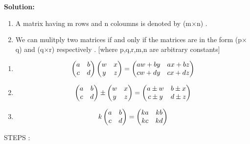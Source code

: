 \documentclass[journal,12pt,twocolumn]{IEEEtran}
\begin{document}
\textbf{Solution:}
       \begin{enumerate}
 \item A matrix having m rows and n coloumns is denoted by
               (m$\times$n) .
  
 \item We can mulitply two matrices if and only if the matrices are 
       in the form (p$\times$q) and (q$\times$r) respectively .
       [where p,q,r,m,n are arbitrary constants]
       \end{enumerate}
       \begin{enumerate}[label=(\roman*)]
 \item \begin{equation}
       \label{eq:2} 
       \begin{pmatrix}a & b \\c & d \end{pmatrix} \begin{pmatrix}w & x \\y & z \end{pmatrix} = 
       \begin{pmatrix}aw+ by & ax+ bz \\cw+ dy& cx+ dz\end{pmatrix} 
       \end{equation}
 \item \begin{equation}
       \label{eq:3}
       \begin{pmatrix}a & b \\c & d \end{pmatrix} 
       \pm \begin{pmatrix}w & x \\y & z \end{pmatrix} =
       \begin{pmatrix}a\pm w & b\pm x \\c\pm y& d\pm z\end{pmatrix} 
       \end{equation}
 \item \begin{equation}
       \label{eq:4}
       k\begin{pmatrix}a & b \\c & d \end{pmatrix} =
       \begin{pmatrix}ka & kb \\kc & kd \end{pmatrix} 
       \end{equation}
       \end{enumerate} 
       STEPS :
\end{document}

